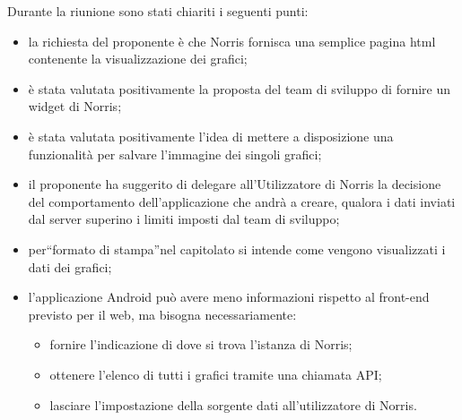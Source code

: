 Durante la riunione sono stati chiariti i seguenti punti:
\begin{itemize}
\item la richiesta del proponente è che Norris fornisca una semplice pagina html contenente la visualizzazione dei grafici;
\item è stata valutata positivamente la proposta del team di sviluppo di fornire un widget di Norris;
\item è stata valutata positivamente l'idea di mettere a disposizione una funzionalità per salvare l'immagine dei singoli grafici;
\item il proponente ha suggerito di delegare all'Utilizzatore di Norris la decisione del comportamento dell'applicazione che andrà a creare, qualora i dati inviati dal server superino i limiti imposti dal team di sviluppo;
\item per“formato di stampa”nel capitolato si intende come vengono visualizzati i dati dei grafici;
\item l'applicazione Android può avere meno informazioni rispetto al front-end previsto per il web, ma bisogna necessariamente:
\begin{itemize}
\item fornire l'indicazione di dove si trova l'istanza di Norris;
\item ottenere l'elenco di tutti i grafici tramite una chiamata API;
\item lasciare l'impostazione della sorgente dati all'utilizzatore di Norris.
\end{itemize}
\end{itemize}